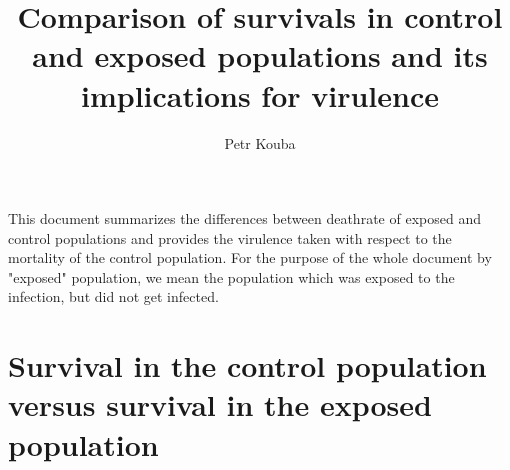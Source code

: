 \documentclass[10pt]{article}         %
\title{Comparison of survivals in control and exposed populations and its implications for virulence}
\author{Petr Kouba}
\begin{document}
\maketitle

This document summarizes the differences between deathrate of exposed and control populations and provides the virulence taken with respect to the mortality of the control population. For the purpose of the whole document by "exposed" population, we mean the population which was exposed to the infection, but did not get infected.

\newpage
\section{Survival in the control population versus survival in the exposed population}
\end{document}
